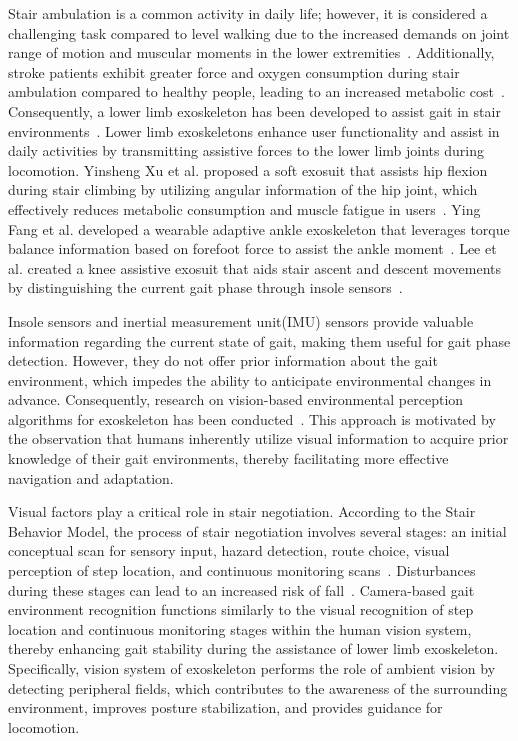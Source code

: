 \documentclass[journal,article,submit,pdftex,moreauthors]{Definitions/mdpi}
\begin{document}
Stair ambulation is a common activity in daily life; however, it is considered a challenging task compared to level walking due to the increased demands on joint range of motion and muscular moments in the lower extremities~\cite{Andriacchi1980}. Additionally, stroke patients exhibit greater force and oxygen consumption during stair ambulation compared to healthy people, leading to an increased metabolic cost~\cite{Jacobs2016,Novak2012}.
Consequently, a lower limb exoskeleton has been developed to assist gait in stair environments~\cite{Hsu2021,Lee2022,Bishe2021}. Lower limb exoskeletons enhance user functionality and assist in daily activities by transmitting assistive forces to the lower limb joints during locomotion. Yinsheng Xu et al. proposed a soft exosuit that assists hip flexion during stair climbing by utilizing angular information of the hip joint, which effectively reduces metabolic consumption and muscle fatigue in users~\cite{Xu2023}. Ying Fang et al. developed a wearable adaptive ankle exoskeleton that leverages torque balance information based on forefoot force to assist the ankle moment~\cite{Fang2021}. Lee et al. created a knee assistive exosuit that aids stair ascent and descent movements by distinguishing the current gait phase through insole sensors~\cite{Lee2020}.

Insole sensors and inertial measurement unit(IMU) sensors provide valuable information regarding the current state of gait, making them useful for gait phase detection\cite{Han2019,Pappas2001}. However, they do not offer prior information about the gait environment, which impedes the ability to anticipate environmental changes in advance. Consequently, research on vision-based environmental perception algorithms for exoskeleton has been conducted~\cite{Liu2019,Yang2023}. This approach is motivated by the observation that humans inherently utilize visual information to acquire prior knowledge of their gait environments, thereby facilitating more effective navigation and adaptation.

Visual factors play a critical role in stair negotiation. According to the Stair Behavior Model, the process of stair negotiation involves several stages: an initial conceptual scan for sensory input, hazard detection, route choice, visual perception of step location, and continuous monitoring scans~\cite{Templer1995}. Disturbances during these stages can lead to an increased risk of fall~\cite{Coleman2004}. Camera-based gait environment recognition functions similarly to the visual recognition of step location and continuous monitoring stages within the human vision system, thereby enhancing gait stability during the assistance of lower limb exoskeleton. Specifically, vision system of exoskeleton performs the role of ambient vision by detecting peripheral fields, which contributes to the awareness of the surrounding environment, improves posture stabilization, and provides guidance for locomotion.
\end{document}
